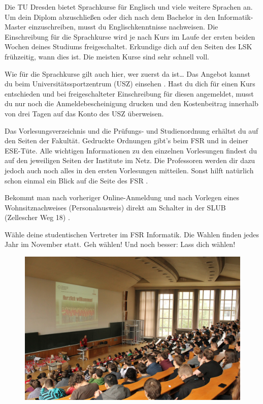 \begin{itemize}[leftmargin=*]
Die TU Dresden bietet Sprachkurse für Englisch und viele weitere Sprachen an. Um dein Diplom abzuschließen oder dich nach dem Bachelor in den Informatik-Master einzuschreiben, musst du Englischkenntnisse nachweisen. Die Einschreibung für die Sprachkurse wird je nach Kurs im Laufe der ersten beiden Wochen deines Studiums freigeschaltet.
Erkundige dich auf den Seiten des LSK  frühzeitig, wann dies ist. Die meisten Kurse sind sehr schnell voll.

Wie für die Sprachkurse gilt auch hier, wer zuerst da ist\ldots{} Das Angebot kannst du beim Universitätssportzentrum (USZ) einsehen .
Hast du dich für einen Kurs entschieden und bei freigeschalteter Einschreibung für diesen angemeldet, musst du nur noch die Anmeldebescheinigung drucken und den Kostenbeitrag innerhalb von drei Tagen auf das Konto des USZ überweisen.

\newpage

Das Vorlesungsverzeichnis  und die Prüfungs- und Studienordnung  erhältst du auf den Seiten der Fakultät.
Gedruckte Ordnungen gibt's beim FSR und in deiner ESE-Tüte.
Alle wichtigen Informationen zu den einzelnen Vorlesungen findest du auf den jeweiligen Seiten der Institute im Netz.
Die Professoren werden dir dazu jedoch auch noch alles in den ersten Vorlesungen mitteilen. Sonst hilft natürlich schon einmal ein Blick auf die Seite des FSR .

Bekommt man nach vorheriger Online-Anmeldung und nach Vorlegen eines Wohnsitznachweises (Personalausweis) direkt am Schalter in der SLUB (Zellescher Weg 18) .

Wähle deine studentischen Vertreter im FSR Informatik.
Die Wahlen finden jedes Jahr im November statt.
Geh wählen!
Und noch besser: Lass dich wählen!

\vfill

\begin{figure}[h!]
\centering
\includegraphics[width=0.9\linewidth]{img/ese2013/barschoe.jpg}
\end{figure}


\end{itemize}

